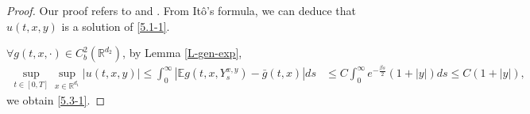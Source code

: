 \documentclass[11pt,reqno]{amsart}
\numberwithin{equation}{section}
\newcommand{\R}{\mathbb{R}}
\begin{document}
\begin{proof}
Our proof refers to \cite[Proposition 3.3]{SXX} and \cite[Theorem 5.2]{KY}. From It\^{o}'s formula,  we can deduce that $u(t,x,y)$ is a solution of \eqref{5.1-1}. %

 $\forall g(t,x,\cdot)\in C_{b}^{ 2}(\mathbb{R}^{d_{2}})$, by Lemma \ref{L-gen-exp},
\begin{align*}
\sup_{t\in [0,T]}\sup_{x\in \mathbb{R}^{d_{1}}} |u(t,x,y)|\leq \int_{0}^{\infty}|\mathbb{E}g(t,x,Y_{s}^{x,y})-\bar{g}(t,x)|ds&\leq  C\int_{0}^{\infty}e^{-\frac{\beta s}{2}}(1+|y|)ds\leq  C(1+|y|),
\end{align*}
we obtain \eqref{5.3-1}.

	

\end{proof}
\end{document}
